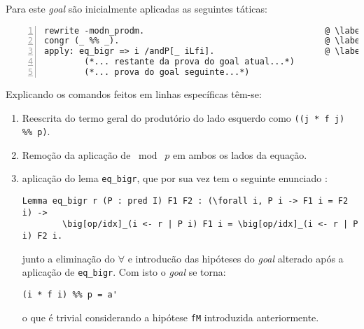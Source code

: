 \begin{enumerate}[label=\textbf{\roman*.}]
\begin{enumerate}[label=\textbf{\roman{enumi}.(\alph*)}]
\begin{enumerate}[label=\textbf{(\alph{enumii}.\arabic*)}]
                        Para este \textit{goal} são inicialmente aplicadas as seguintes táticas:
                
                        \begin{lstlisting}[language=coq,frame=single, numbers=left,stepnumber=1,tabsize=1, escapechar=@, name=proof]
rewrite -modn_prodm.                                    @ \label{line:36-item4b-item1} @
congr (_ %% _).                                         @ \label{line:37-item4b-item1} @
apply: eq_bigr => i /andP[_ iLfi].                      @ \label{line:38-item4b-item1} @
        (*... restante da prova do goal atual...*)                        
        (*... prova do goal seguinte...*)                        
                        \end{lstlisting}

                        Explicando os comandos feitos em linhas específicas têm-se:
                        \begin{enumerate}
                                \item[\textbf{(\ref{line:36-item4b-item1})}] Reescrita do termo geral do produtório do lado esquerdo como \lstinline[language=coq]|((j * f j) %% p)|.
                        
                                \item[\textbf{(\ref{line:37-item4b-item1})}] Remoção da aplicação de $\bmod \; p$ em ambos os lados da equação.
                        
                                \item[\textbf{(\ref{line:38-item4b-item1})}] aplicação do lema \lstinline[language=coq]|eq_bigr|, que por sua vez tem o seguinte enunciado \cite{mathcomp-bigop}:
                        
                                        \begin{lstlisting}[language=coq,frame=single,tabsize=1]
Lemma eq_bigr r (P : pred I) F1 F2 : (\forall i, P i -> F1 i = F2 i) ->
        \big[op/idx]_(i <- r | P i) F1 i = \big[op/idx]_(i <- r | P i) F2 i.
                                        \end{lstlisting}
                                junto a eliminação do $\forall$ e introducão das hipóteses do  \textit{goal} alterado após a aplicação de \lstinline[language=coq]|eq_bigr|. Com isto o \textit{goal} se torna:

                                        \begin{lstlisting}[language=coq,frame=single,tabsize=1]
(i * f i) %% p = a'
                                        \end{lstlisting}
                                o que é trivial considerando a hipótese \lstinline[language=coq]|fM| introduzida anteriormente.
                        \end{enumerate}
                

\end{enumerate}
\end{enumerate}
\end{enumerate}
